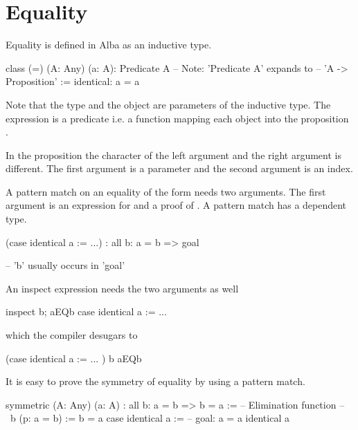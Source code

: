 \section{Equality}

Equality is defined in Alba as an inductive type.
\begin{alba}
    class
        (=) (A: Any) (a: A): Predicate A
            -- Note: 'Predicate A' expands to
            --       'A -> Proposition'
    :=
        identical: a = a
\end{alba}

Note that the type  and the object  are parameters of the
inductive type. The expression  is a predicate i.e. a function
 mapping each object  into the
proposition .

In the proposition  the character of the left argument  and
the right argument  is different. The first argument is a parameter and
the second argument is an index.

A pattern match on an equality of the form  needs two arguments. The
first argument is an expression for  and a proof of . A
pattern match has a dependent type.

\begin{alba}
    (case identical a := ...)
    : all b: a = b => goal

    -- 'b' usually occurs in 'goal'
\end{alba}

An inspect expression needs the two arguments as well
%
\begin{alba}
    inspect
        b; aEQb
    case
        identical a := ...
\end{alba}
%
which the compiler desugars to
\begin{alba}
    (case
        identical a := ...
    )
        b aEQb
\end{alba}



It is easy to prove the symmetry of equality by using a pattern match.
\begin{alba}
    symmetric
        (A: Any) (a: A)
        : all b: a = b => b = a
    :=
        -- Elimination function
        -- \ b (p: a = b) := b = a
        case
            identical a :=
                    -- goal: a = a
                identical a
\end{alba}

